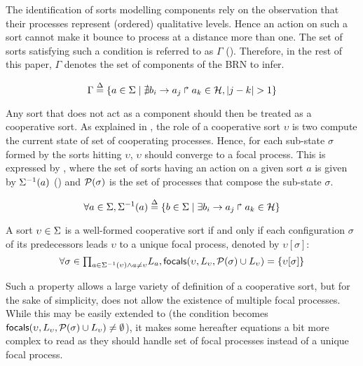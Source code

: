 The identification of sorts modelling components rely on the observation that their processes
represent (ordered) qualitative levels.
Hence an action on such a sort cannot make it bounce to process at a distance more than one.
The set of sorts satisfying such a condition is referred to as $\Gamma$
().
Therefore, in the rest of this paper, $\Gamma$ denotes the set of components of the BRN to infer.

\begin{equation}
\Gamma \stackrel{\Delta}= \{a \in \Sigma \mid \nexists b_i\rightarrow a_j\Rsh a_k \in \mathcal{H}, |j - k| > 1\} \\
\label{eq:PH-components}
\end{equation}

Any sort that does not act as a component should then be treated as a cooperative sort.
As explained in , the role of a cooperative sort $\upsilon$ is two compute the current
state of set of cooperating processes.
Hence, for each sub-state $\sigma$ formed by the sorts hitting $\upsilon$, $\upsilon$ should
converge to a focal process.
This is expressed by , where
the set of sorts having an action on a given sort $a$ is given by 
$\Sigma^{-1}(a)$ ()
and $\mathcal{P}(\sigma)$ is the set of processes that compose the sub-state $\sigma$.

\begin{equation}
\forall a \in \Sigma, \Sigma^{-1}(a) \stackrel{\Delta}= \{b \in \Sigma \mid \exists b_i\rightarrow a_j\Rsh a_k\in\mathcal{H} \}
\label{eq:ph_direct_predec}
\end{equation}

\begin{property}\label{pro:wf-cooperative-sort}
A sort $\upsilon\in\Sigma$ is a well-formed cooperative sort if and only if
each configuration $\sigma$ of its predecessors leads $\upsilon$ to a unique focal process,
denoted by $\upsilon[\sigma]$:
\[
\forall \sigma \in {\textstyle\prod_{
a\in\Sigma^{-1}(\upsilon) \wedge a\neq \upsilon}}
L_{a},
\mathsf{focals}(\upsilon,L_\upsilon,\mathcal{P}(\sigma)\cup L_\upsilon) = \{ \upsilon[\sigma] \}\]
\end{property}

Such a property allows a large variety of definition of a cooperative sort, but
for the sake of simplicity, does not allow the existence of multiple focal processes.
While this may be easily extended to (the condition becomes 
$\mathsf{focals}(\upsilon,L_\upsilon, \mathcal{P}(\sigma)\cup L_\upsilon)\neq\emptyset$), it makes some
hereafter equations a bit more complex to read as they should handle set of focal processes instead
of a unique focal process.


